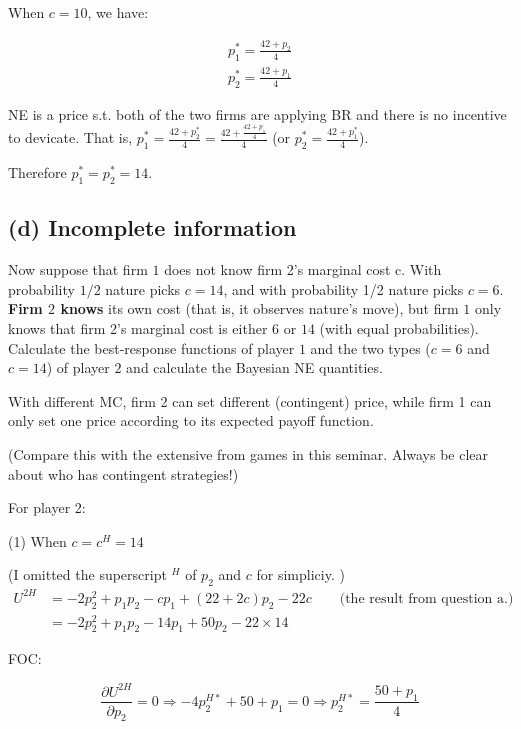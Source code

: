 \documentclass{article}
\begin{document}
When $c = 10$, we have:


\begin{align*}
p^*_1 = \frac{42+p_2}{4} \\
p^*_2 = \frac{42+p_1}{4}
\end{align*}

NE is a price s.t. both of the two firms are applying BR and there is no incentive to devicate.
That is, $p^*_1 = \frac{42+p^*_2}{4} =\frac{42+\frac{42+p_1}{4}}{4}$ (or $p^*_2 = \frac{42+p^*_1}{4}$).

Therefore $p^*_1 = p^*_2 =14$.

\subsection*{(d) Incomplete information} Now suppose that firm $1$ does not know firm 2's marginal cost c. With
probability $1/2$ nature picks $c = 14$, and with probability 1/2 nature
picks $c = 6$. \textbf{Firm $2$ knows} its own cost (that is, it observes nature's
move), but firm $1$ only knows that firm 2's marginal cost is either $6$ or
$14$ (with equal probabilities). Calculate the best-response functions of
player $1$ and the two types ($c = 6$ and $c = 14$) of player $2$ and calculate
the Bayesian NE quantities.

\bigskip

\begin{mdframed}[backgroundcolor=blue!20,linecolor=white]
With different MC, firm 2 can set different (contingent) price, while firm 1 can only set one price according to its expected payoff function.
\medskip

(Compare this with the extensive from games in this seminar. Always be clear about who has contingent strategies!)

\end{mdframed}

For player 2:

(1) When $c=c^H=14$

(I omitted the superscript $^H$ of $p_2$ and $c$ for simpliciy. )
\begin{align*}
U^{2H} &= -2p_2^2 +p_1p_2 -cp_1 + (22+2c)p_2 -22c \quad \quad \text{(the result from question a.)}  \\
&= -2p_2^2 +p_1p_2 -14p_1 + 50p_2 -22 \times 14
\end{align*}

FOC:

$$\frac{\partial U^{2H}}{\partial p_2} = 0 \Rightarrow -4p^{H*}_2+ 50 + p_1 = 0 \Rightarrow p^{H*}_2 = \frac{50+p_1}{4}$$
\end{document}
